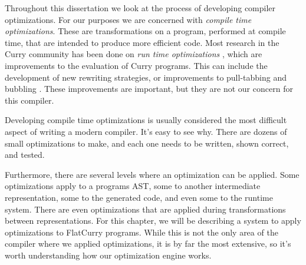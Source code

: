 \documentclass{book}
\theoremstyle{definition}
\begin{document}
Throughout this dissertation we look at the process of developing compiler optimizations.
For our purposes we are concerned with 
\emph{compile time optimizations}.
These are transformations on a program, performed at compile time,
that are intended to produce more efficient code.
Most research in the Curry community has been done on \emph{run time optimizations}
, which are improvements to the evaluation of Curry programs.
This can include the development of new rewriting strategies, or improvements to
pull-tabbing and bubbling \cite{sprite,bubblingPractical}.
These improvements are important, but they are not our concern for this compiler.

Developing compile time optimizations is usually considered 
the most difficult aspect of writing a modern compiler.
It's easy to see why.
There are dozens of small optimizations to make, 
and each one needs to be written, shown correct, and tested.

Furthermore, there are several levels where an optimization can be applied.
Some optimizations apply to a programs AST, some to another intermediate representation,
some to the generated code, and even some to the runtime system.
There are even optimizations that are applied during transformations between representations.
For this chapter, we will be describing a system to apply optimizations to FlatCurry programs.
While this is not the only area of the compiler where we applied optimizations,
it is by far the most extensive, so it's worth understanding how our optimization engine works.
\end{document}
